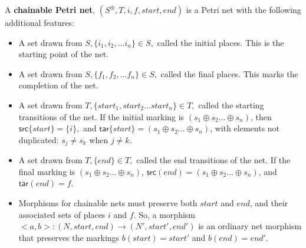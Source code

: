 \begin{definition}
  \label{Chainable-Petri-Net}
  A \textbf{chainable Petri net}, $(S^\oplus, T, i, f, start, end)$ is a Petri net with the following additional features: 
  \begin{itemize}
  \item A set drawn from $S, \{i_1, i_2, ... i_n\} \in S,$ called the initial places. This is the starting point of the net.
  \item A set drawn from $S, \{f_1, f_2, ... f_n\} \in S,$ called the final places. This marks the completion of the net.
  \item A set drawn from $T, \{start_1, start_2... start_n\} \in T,$ called the starting transitions of the net. If the initial marking is $(s_1 \oplus s_2 ... \oplus s_n)$, then $\mathsf{src}\{start\} = \{i\},$ and $\mathsf{tar}\{start\} = (s_1 \oplus s_2 ... \oplus s_n)$, with elements not duplicated: $s_j \neq s_k$ when $j \neq k$. %
  \item A set drawn from $T, \{end\} \in T,$ called the end transitions of the net. If the final marking is $(s_1 \oplus s_2 ... \oplus s_n)$, $\mathsf{src}(end) = (s_1 \oplus s_2 ... \oplus s_n)$, and $\mathsf{tar}(end) = f$. 
   \item Morphisms for chainable nets must preserve both $start$ and $end$, and their associated sets of places $i$ and $f$. So, a morphism $<a,b>: (N, start, end) \to (N', start', end')$ is an ordinary net morphism that preserves the markings $b(start) = start'$ and $b(end) = end'$. 
 \end{itemize}
\end{definition}

